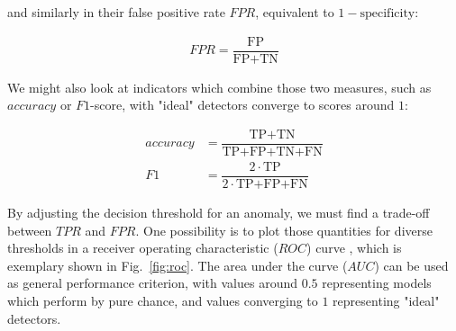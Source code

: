 \documentclass[conference]{IEEEtran}
\begin{document}
and similarly in their false positive rate $FPR$, equivalent to $1-\text{specificity}$:

\begin{eqnarray}  \label{eq:fpr}
    FPR = \dfrac{ \text{FP} }{ \text{FP}+\text{TN} }
\end{eqnarray}

We might also look at indicators which combine those two measures, such as $accuracy$ or $F1$-score, with "ideal" detectors converge to scores around $1$:

\begin{align}  \label{eq:accuracy}
    accuracy &= \dfrac{ \text{TP+TN} }{ \text{TP+FP+TN+FN} } \\
    F1 &= \dfrac{ 2 \cdot \text{TP}  } {  2 \cdot \text{TP+FP+FN}  }
\end{align}

By adjusting the decision threshold for an anomaly, we must find a trade-off between $TPR$ and $FPR$. One possibility is to plot those quantities for diverse thresholds in a receiver operating characteristic ($ROC$) curve \cite{bewick2004statistics}, which is exemplary shown in Fig.~\ref{fig:roc}. The area under the curve ($AUC$) can be used as general performance criterion, with values around $0.5$ representing models which perform by pure chance, and values converging to $1$ representing "ideal" detectors.
\end{document}
